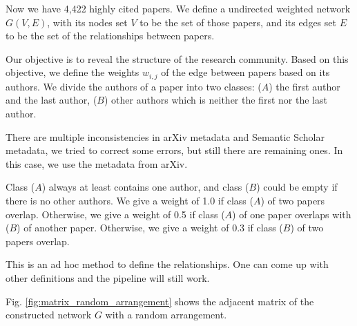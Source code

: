 Now we have 4,422 highly cited papers.
We define a undirected weighted network $G(V,E)$, with its nodes set $V$ to be the set of those papers, and its edges set $E$ to be the set of the relationships between papers.

Our objective is to reveal the structure of the research community.
Based on this objective, we define the weights $w_{i,j}$ of the edge between papers based on its authors.
We divide the authors of a paper into two classes: ($A$) the first author and the last author, ($B$) other authors which is neither the first nor the last author.

There are multiple inconsistencies in arXiv metadata and Semantic Scholar metadata, we tried to correct some errors, but still there are remaining ones.
In this case, we use the metadata from arXiv.

Class ($A$) always at least contains one author, and class ($B$) could be empty if there is no other authors.
We give a weight of 1.0 if class ($A$) of two papers overlap.
Otherwise, we give a weight of 0.5 if class ($A$) of one paper overlaps with ($B$) of another paper.
Otherwise, we give a weight of 0.3 if class ($B$) of two papers overlap.

This is an ad hoc method to define the relationships.
One can come up with other definitions and the pipeline will still work.

Fig. \ref{fig:matrix_random_arrangement} shows the adjacent matrix of the constructed network $G$ with a random arrangement.

